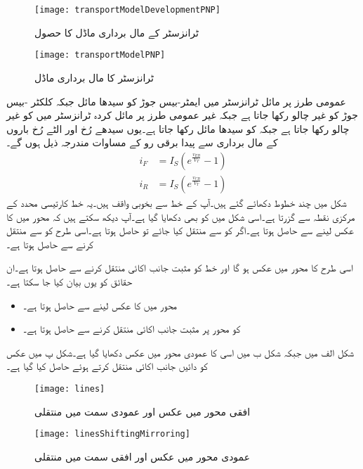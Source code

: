 \begin{figure}
\centering
\texttt{[image: transportModelDevelopmentPNP]}
\caption{ ٹرانزسٹر کے مال برداری ماڈل کا حصول}
\label{شکل_ٹرانزسٹر_کا_مال_برداری_ماڈل_کا_حصول_مثبت_منفی_مثبت}
\end{figure}
%
\begin{figure}
\centering
\texttt{[image: transportModelPNP]}
\caption{ ٹرانزسٹر کا مال برداری ماڈل}
\label{شکل_ٹرانزسٹر_کا_مال_برداری_ماڈل_مثبت_منفی_مثبت}
\end{figure}
عمومی طرز پر مائل ٹرانزسٹر میں ایمٹر-بیس جوڑ کو سیدھا مائل   جبکہ کلکٹر -بیس جوڑ کو غیر چالو رکھا جاتا ہے جبکہ غیر عمومی طرز پر مائل کردہ   ٹرانزسٹر میں   کو غیر چالو رکھا جاتا ہے جبکہ  کو سیدھا مائل رکھا جاتا ہے۔یوں سیدھے رُخ اور الٹے رُخ باروں کے مال برداری سے پیدا برقی رو کے مساوات مندرجہ ذیل ہوں گے۔
\begin{align}
i_F&=I_S \left (e^{\frac{v_{EB}}{V_T}}-1 \right )\\
i_R&=I_S \left(e^{\frac{v_{CB}}{V_T}}-1 \right )
\end{align}
شکل  میں چند خطوط دکھائے گئے ہیں۔آپ  کے خط سے بخوبی واقف ہیں۔یہ خط کارتیسی محدد کے مرکزی  نقطہ  سے گزرتا ہے۔اسی شکل میں  کو بھی دکھایا گیا ہے۔آپ دیکھ سکتے ہیں کہ  محور میں  کا  عکس لینے سے  حاصل ہوتا ہے۔اگر  کو  سے  منتقل کیا جائے تو  حاصل ہوتا ہے۔اسی طرح   کو  سے  منتقل کرنے سے  حاصل ہوتا ہے۔

اسی طرح   کا  محور میں عکس  ہو گا اور خط کو مثبت  جانب  اکائی منتقل کرنے سے  حاصل ہوتا ہے۔ان حقائق کو یوں بیان کیا جا سکتا ہے۔
\begin{itemize}
\item
{} محور میں   کا عکس لینے سے  حاصل ہوتا ہے۔
\item
{} کو  محور پر مثبت جانب  اکائی  منتقل کرنے سے  حاصل ہوتا ہے۔
\end{itemize} 
شکل  الف  میں  جبکہ شکل ب میں اسی کا عمودی محور میں عکس  دکھایا گیا ہے۔شکل پ میں عکس کو دائیں جانب  اکائی منتقل کرتے ہوئے  حاصل کیا گیا ہے۔
%
\begin{figure}
\centering
\texttt{[image: lines]}
\caption{افقی محور میں عکس اور عمودی سمت میں منتقلی}
\label{شکل_ٹرانزسٹر_افقی_عکس_عمودی_منتقلی}
\end{figure}
%
\begin{figure}
\centering
\texttt{[image: linesShiftingMirroring]}
\caption{عمودی محور میں عکس اور افقی سمت میں منتقلی}
\label{شکل_ٹرانزسٹر_عمودی_عکس_افقی_منتقلی}
\end{figure}
%

